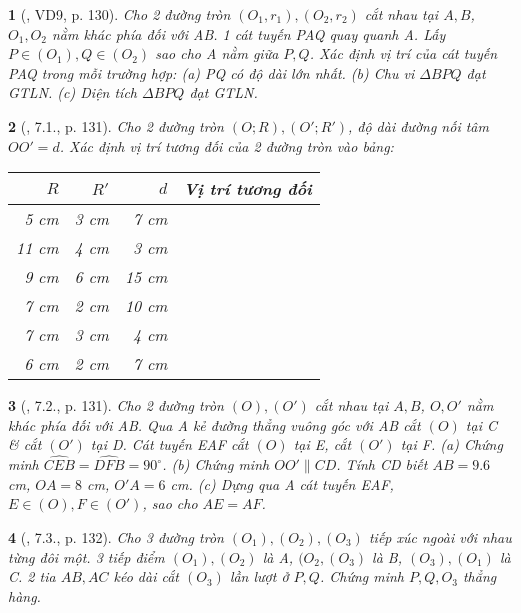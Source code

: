 \documentclass{article}
\newtheorem{baitoan}{}
\begin{document}
\begin{baitoan}[\cite{Binh_boi_duong_Toan_9_tap_1}, VD9, p. 130]
	Cho 2 đường tròn $(O_1,r_1),(O_2,r_2)$ cắt nhau tại $A,B$, $O_1,O_2$ nằm khác phía đối với AB. 1 cát tuyến PAQ quay quanh A. Lấy $P\in(O_1),Q\in(O_2)$ sao cho A nằm giữa $P,Q$. Xác định vị trí của cát tuyến PAQ trong mỗi trường hợp: (a) PQ có độ dài lớn nhất. (b) Chu vi $\Delta BPQ$ đạt {\rm GTLN}. (c) Diện tích $\Delta BPQ$ đạt {\rm GTLN}.
\end{baitoan}

\begin{baitoan}[\cite{Binh_boi_duong_Toan_9_tap_1}, 7.1., p. 131]
	Cho 2 đường tròn $(O;R),(O';R')$, độ dài đường nối tâm $OO' = d$. Xác định vị trí tương đối của 2 đường tròn vào bảng:
	\begin{table}[H]
		\centering
		\begin{tabular}{|r|r|r|c|}
			\hline
			$R$ & $R'$ & $d$ & Vị trí tương đối \\
			\hline
			5 cm & 3 cm & 7 cm &  \\
			\hline
			11 cm & 4 cm & 3 cm &  \\
			\hline
			9 cm & 6 cm & 15 cm &  \\
			\hline
			7 cm & 2 cm & 10 cm &  \\
			\hline
			7 cm & 3 cm & 4 cm &  \\
			\hline
			6 cm & 2 cm & 7 cm &  \\
			\hline
		\end{tabular}
	\end{table}
\end{baitoan}

\begin{baitoan}[\cite{Binh_boi_duong_Toan_9_tap_1}, 7.2., p. 131]
	Cho 2 đường tròn $(O),(O')$ cắt nhau tại $A,B$, $O,O'$ nằm khác phía đối với AB. Qua A kẻ đường thẳng vuông góc với AB cắt $(O)$ tại C \& cắt $(O')$ tại D. Cát tuyến EAF cắt $(O)$ tại E, cắt $(O')$ tại F. (a) Chứng minh $\widehat{CEB} = \widehat{DFB} = 90^\circ$. (b) Chứng minh $OO'\parallel CD$. Tính CD biết $AB = 9.6$ {\rm cm}, $OA = 8$  {\rm cm}, $O'A = 6$ {\rm cm}. (c) Dựng qua A cát tuyến EAF, $E\in(O),F\in(O')$, sao cho $AE = AF$.
\end{baitoan}

\begin{baitoan}[\cite{Binh_boi_duong_Toan_9_tap_1}, 7.3., p. 132]
	Cho 3 đường tròn $(O_1),(O_2),(O_3)$ tiếp xúc ngoài với nhau từng đôi một. 3 tiếp điểm $(O_1),(O_2)$ là A, $(O_2,(O_3)$ là B, $(O_3),(O_1)$ là C. 2 tia $AB,AC$ kéo dài cắt $(O_3)$ lần lượt ở $P,Q$. Chứng minh $P,Q,O_3$ thẳng hàng.
\end{baitoan}
\end{document}
